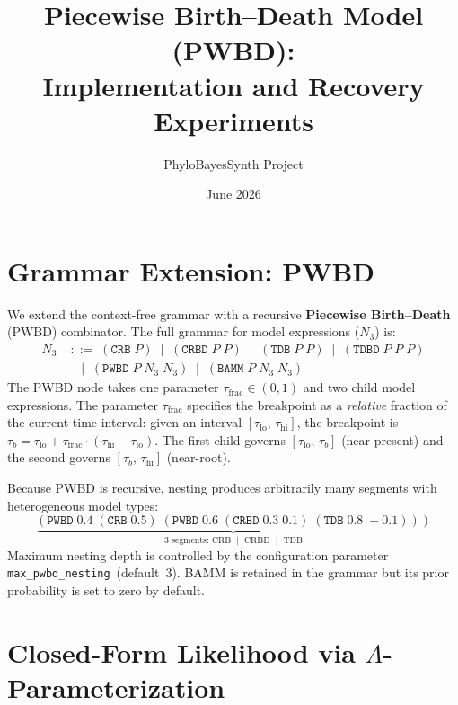 \documentclass[11pt,a4paper]{article}
\title{Piecewise Birth--Death Model (PWBD):\\Implementation and Recovery Experiments}
\author{PhyloBayesSynth Project}
\date{June 2026}
\begin{document}
\maketitle

\section{Grammar Extension: PWBD}

We extend the context-free grammar with a recursive \textbf{Piecewise Birth--Death} (PWBD) combinator.
The full grammar for model expressions ($N_3$) is:
\begin{align*}
  N_3 &\;::=\; (\texttt{CRB}\; P)
         \;\mid\; (\texttt{CRBD}\; P\; P)
         \;\mid\; (\texttt{TDB}\; P\; P)
         \;\mid\; (\texttt{TDBD}\; P\; P\; P) \\
      &\;\;\;\mid\; (\texttt{PWBD}\; P\; N_3\; N_3)
         \;\mid\; (\texttt{BAMM}\; P\; N_3\; N_3)
\end{align*}
The PWBD node takes one parameter $\tau_{\mathrm{frac}} \in (0,1)$ and two child model expressions.
The parameter $\tau_{\mathrm{frac}}$ specifies the breakpoint as a \emph{relative} fraction of the current time interval:
given an interval $[\tau_{\mathrm{lo}},\, \tau_{\mathrm{hi}}]$, the breakpoint is
$\tau_b = \tau_{\mathrm{lo}} + \tau_{\mathrm{frac}} \cdot (\tau_{\mathrm{hi}} - \tau_{\mathrm{lo}})$.
The first child governs $[\tau_{\mathrm{lo}},\, \tau_b]$ (near-present) and the second governs $[\tau_b,\, \tau_{\mathrm{hi}}]$ (near-root).

Because PWBD is recursive, nesting produces arbitrarily many segments with heterogeneous model types:
\[
  \underbrace{(\texttt{PWBD}\; 0.4\; (\texttt{CRB}\; 0.5)\;
    (\texttt{PWBD}\; 0.6\; (\texttt{CRBD}\; 0.3\; 0.1)\; (\texttt{TDB}\; 0.8\; {-}0.1)))}_{\text{3 segments: CRB $\mid$ CRBD $\mid$ TDB}}
\]
Maximum nesting depth is controlled by the configuration parameter \texttt{max\_pwbd\_nesting}~(default~3).
BAMM is retained in the grammar but its prior probability is set to zero by default.

\section{Closed-Form Likelihood via $\Lambda$-Parameterization}
\end{document}
